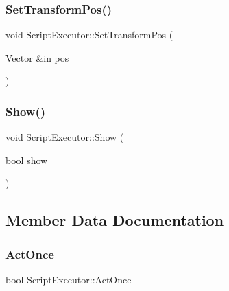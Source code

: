 \hypertarget{class_script_executor_a392598ab139da46ff003216549f94e3e}{}\label{class_script_executor_a392598ab139da46ff003216549f94e3e} 
\subsubsection{\texorpdfstring{Set\+Transform\+Pos()}{SetTransformPos()}}
{\footnotesize\ttfamily void Script\+Executor\+::\+Set\+Transform\+Pos (\begin{DoxyParamCaption}\item[{Vector \&in}]{pos }\end{DoxyParamCaption})}

\hypertarget{class_script_executor_a00b402dfcc634316cfaa4ba4ce108c68}{}\label{class_script_executor_a00b402dfcc634316cfaa4ba4ce108c68} 
\subsubsection{\texorpdfstring{Show()}{Show()}}
{\footnotesize\ttfamily void Script\+Executor\+::\+Show (\begin{DoxyParamCaption}\item[{bool}]{show }\end{DoxyParamCaption})}



\subsection{Member Data Documentation}
\hypertarget{class_script_executor_a32e9e5d277a3b45efffe0e0c68817b9c}{}\label{class_script_executor_a32e9e5d277a3b45efffe0e0c68817b9c} 
\subsubsection{\texorpdfstring{Act\+Once}{ActOnce}}
{\footnotesize\ttfamily bool Script\+Executor\+::\+Act\+Once}

\hypertarget{class_script_executor_a934f2b98ec61c94d5a28571f8323f6b1}{}\label{class_script_executor_a934f2b98ec61c94d5a28571f8323f6b1} 
